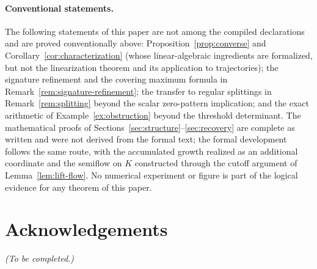 \documentclass[11pt,a4paper]{article}
\theoremstyle{plain}
\theoremstyle{definition}
\theoremstyle{remark}
\begin{document}
\paragraph{Conventional statements.}
The following statements of this paper are not among the compiled declarations and are proved conventionally above: Proposition~\ref{prop:converse} and Corollary~\ref{cor:characterization} (whose linear-algebraic ingredients are formalized, but not the linearization theorem and its application to trajectories); the signature refinement and the covering maximum formula in Remark~\ref{rem:signature-refinement}; the transfer to regular splittings in Remark~\ref{rem:splitting} beyond the scalar zero-pattern implication; and the exact arithmetic of Example~\ref{ex:obstruction} beyond the threshold determinant. The mathematical proofs of Sections~\ref{sec:structure}--\ref{sec:recovery} are complete as written and were not derived from the formal text; the formal development follows the same route, with the accumulated growth realized as an additional coordinate and the semiflow on $K$ constructed through the cutoff argument of Lemma~\ref{lem:lift-flow}. No numerical experiment or figure is part of the logical evidence for any theorem of this paper.

\clearpage
\section*{Acknowledgements}
\emph{(To be completed.)}



\end{document}
